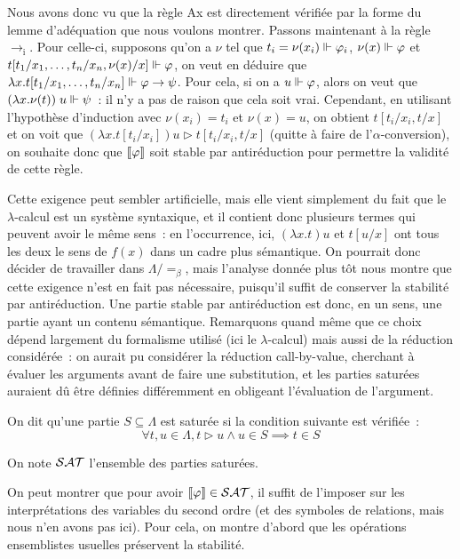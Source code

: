 \documentclass{article}
\begin{document}
Nous avons donc vu que la règle Ax est directement vérifiée par la forme du lemme d'adéquation que nous voulons montrer. Passons maintenant à la règle $\to_\mathrm i$. Pour celle-ci, supposons qu'on a $\nu$ tel que $t_i = \nu(x_i) \Vdash \varphi_i$, $\nu(x) \Vdash \varphi$ et $t[t_1/x_1,\ldots,t_n/x_n, \nu(x)/x]\Vdash \varphi$, on veut en déduire que $\lambda x.t[t_1/x_1,\ldots,t_n/x_n]\Vdash \varphi\to\psi$. Pour cela, si on a $u \Vdash \varphi$, alors on veut que $(\lambda x.\nu(t))\;u\Vdash \psi$~: il n'y a pas de raison que cela soit vrai. Cependant, en utilisant l'hypothèse d'induction avec $\nu(x_i) = t_i$ et $\nu(x) = u$, on obtient $t[t_i/x_i, t/x]$ et on voit que $(\lambda x.t[t_i/x_i])u \rhd t[t_i/x_i, t/x]$ (quitte à faire de l'$\alpha$-conversion), on souhaite donc que $\llbracket \varphi \rrbracket$ soit stable par antiréduction pour permettre la validité de cette règle.

Cette exigence peut sembler artificielle, mais elle vient simplement du fait que le $\lambda$-calcul est un système syntaxique, et il contient donc plusieurs termes qui peuvent avoir le même sens~: en l'occurrence, ici, $(\lambda x.t)u$ et $t[u/x]$ ont tous les deux le sens de $f(x)$ dans un cadre plus sémantique. On pourrait donc décider de travailler dans $\Lambda/=_\beta$, mais l'analyse donnée plus tôt nous montre que cette exigence n'est en fait pas nécessaire, puisqu'il suffit de conserver la stabilité par antiréduction. Une partie stable par antiréduction est donc, en un sens, une partie ayant un contenu sémantique. Remarquons quand même que ce choix dépend largement du formalisme utilisé (ici le $\lambda$-calcul) mais aussi de la réduction considérée~: on aurait pu considérer la réduction call-by-value, cherchant à évaluer les arguments avant de faire une substitution, et les parties saturées auraient dû être définies différemment en obligeant l'évaluation de l'argument.

\begin{defi}
    On dit qu'une partie $S\subseteq \Lambda$ est saturée si la condition suivante est vérifiée~:
    \[\forall t,u\in \Lambda, t \rhd u \land u \in S \implies t \in S\]

    On note $\mathcal {SAT}$ l'ensemble des parties saturées.
\end{defi}

On peut montrer que pour avoir $\llbracket \varphi \rrbracket \in \mathcal {SAT}$, il suffit de l'imposer sur les interprétations des variables du second ordre (et des symboles de relations, mais nous n'en avons pas ici). Pour cela, on montre d'abord que les opérations ensemblistes usuelles préservent la stabilité.
\end{document}
